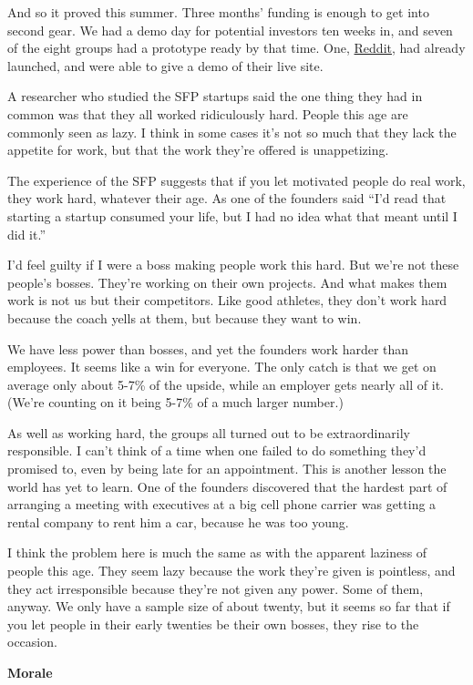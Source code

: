 And so it proved this summer. Three months' funding is enough to get
into second gear. We had a demo day for potential investors ten weeks
in, and seven of the eight groups had a prototype ready by that time.
One, \href{http://reddit.com}{Reddit}, had already launched, and were
able to give a demo of their live site.

A researcher who studied the SFP startups said the one thing they had in
common was that they all worked ridiculously hard. People this age are
commonly seen as lazy. I think in some cases it's not so much that they
lack the appetite for work, but that the work they're offered is
unappetizing.

The experience of the SFP suggests that if you let motivated people do
real work, they work hard, whatever their age. As one of the founders
said ``I'd read that starting a startup consumed your life, but I had no
idea what that meant until I did it.''

I'd feel guilty if I were a boss making people work this hard. But we're
not these people's bosses. They're working on their own projects. And
what makes them work is not us but their competitors. Like good
athletes, they don't work hard because the coach yells at them, but
because they want to win.

We have less power than bosses, and yet the founders work harder than
employees. It seems like a win for everyone. The only catch is that we
get on average only about 5-7\% of the upside, while an employer gets
nearly all of it. (We're counting on it being 5-7\% of a much larger
number.)

As well as working hard, the groups all turned out to be extraordinarily
responsible. I can't think of a time when one failed to do something
they'd promised to, even by being late for an appointment. This is
another lesson the world has yet to learn. One of the founders
discovered that the hardest part of arranging a meeting with executives
at a big cell phone carrier was getting a rental company to rent him a
car, because he was too young.

I think the problem here is much the same as with the apparent laziness
of people this age. They seem lazy because the work they're given is
pointless, and they act irresponsible because they're not given any
power. Some of them, anyway. We only have a sample size of about twenty,
but it seems so far that if you let people in their early twenties be
their own bosses, they rise to the occasion.

\textbf{Morale}

